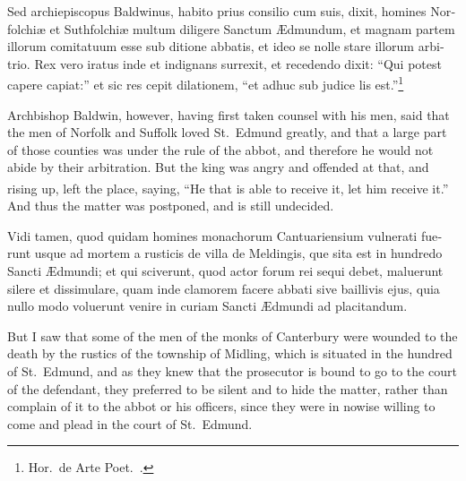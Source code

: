 \documentclass{book}
\newcounter{engnote}
\newcommand{\engnotenum}{\textsuperscript{\arabic{engnote}\stepcounter{engnote}}}
\newcommand{\engnotetext}[1]{\vphantom{\footnotemark{}}\footnotetext{#1}}
\begin{document}
\begin{paracol}{2}
\switchcolumn*

\begin{otherlanguage}{latin}
Sed archiepiscopus Baldwinus, habito prius consilio cum suis, dixit, homines Norfolchi\ae{} et Suthfolchi\ae{} multum diligere Sanctum \AE{}dmundum, et magnam partem illorum comitatuum esse sub ditione abbatis, et ideo se nolle stare illorum arbitrio. Rex vero iratus inde et indignans surrexit, et recedendo dixit: ``Qui potest capere capiat:''\engnotetext{Matt.\ xix., \oldstylenums{12}.} et sic res cepit dilationem, ``et adhuc sub judice lis est.''\footnote[\textdagger]{Hor.\ de Arte Poet.\ .}
\end{otherlanguage}

\switchcolumn

Archbishop Baldwin, however, having first taken counsel with his men, said that the men of Norfolk and Suffolk loved St.\ Edmund greatly, and that a large part of those counties was under the rule of the abbot, and therefore he would not abide by their arbitration. But the king was angry and offended at that, and rising up, left the place, saying, ``He that is able to receive it, let him receive it.''\engnotenum{} And thus the matter was postponed, and is still undecided.

\switchcolumn*

\begin{otherlanguage}{latin}
Vidi tamen, quod quidam homines monachorum Cantuariensium vulnerati fuerunt usque ad mortem a rusticis de villa de Meldingis, que sita est in hundredo Sancti \AE{}dmundi; et qui sciverunt, quod actor forum rei sequi debet, maluerunt silere et dissimulare, quam inde clamorem facere abbati sive baillivis ejus, quia nullo modo voluerunt venire in curiam Sancti \AE{}dmundi ad placitandum.
\end{otherlanguage}

\switchcolumn

But I saw that some of the men of the monks of Canterbury were wounded to the death by the rustics of the township of Midling, which is situated in the hundred of St.\ Edmund, and as they knew that the prosecutor is bound to go to the court of the defendant, they preferred to be silent and to hide the matter, rather than complain of it to the abbot or his officers, since they were in nowise willing to come and plead in the court of St.\ Edmund.

\switchcolumn*


\end{paracol}
\end{document}
